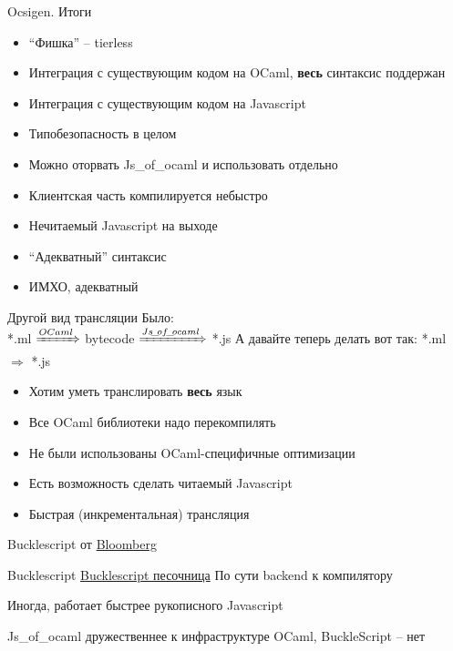 \documentclass{beamer}
\theoremstyle{definition}
\newcommand{\faGood}{\textcolor{ForestGreen}{\faThumbsUp}}
\newcommand{\faBad}{\textcolor{red}{\faThumbsODown}}
\newcommand{\jsoo}{Js\_of\_ocaml }
\begin{document}
\begin{frame}[fragile]{Ocsigen. Итоги}
\begin{itemize}
 \item ``Фишка'' -- tierless \pause
 \item Интеграция с существующим кодом на OCaml, \textbf{весь} синтаксис поддержан \pause
 \item Интеграция с существующим кодом на Javascript \pause
 \item Типобезопасность в целом \pause
 \item Можно оторвать \jsoo и использовать отдельно \pause
 \item[\faBad] Клиентская часть компилируется небыстро \pause
 \item[\faBad] Нечитаемый Javascript на выходе \pause
 \item[\faBad]  ``Адекватный'' синтаксис \pause
 \item[\faGood] ИМХО, адекватный
\end{itemize}

\end{frame}


\begin{frame}[fragile]{Другой вид трансляции}
Было:\\
*.ml $\xRightarrow{OCaml}$ bytecode $\xRightarrow{Js\!\_\!of\!\_\!ocaml}$ *.js
\vskip10mm\pause
А давайте теперь делать вот так:
*.ml $\Rightarrow$ *.js
\begin{itemize}
 \item Хотим уметь транслировать \textbf{весь} язык\pause
 \item [\faBad]  Все OCaml библиотеки надо перекомпилять 
 \item [\faBad]  Не были использованы OCaml-специфичные оптимизации
 \item [\faGood] Есть возможность сделать читаемый Javascript
 \item [\faGood] Быстрая (инкрементальная) трансляция
\end{itemize}
\vskip5mm\pause
Bucklescript от \href{https://www.techatbloomberg.com/}{Bloomberg}\\
\end{frame}

\begin{frame}[fragile]{Bucklescript\href{https://github.com/BuckleScript/bucklescript}{\faGithub}}
\href{https://bucklescript.github.io/bucklescript-playground/index.html}{Bucklescript песочница}
\vskip5mm
\pause
По сути backend к компилятору \vskip5mm\pause

Иногда, работает быстрее рукописного Javascript \vskip5mm\pause

\jsoo дружественнее к инфраструктуре OCaml, BuckleScript -- нет
\end{frame}
\end{document}
